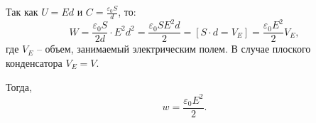     Так как \( U = Ed\) и \( C = \frac{\varepsilon_0 S}{d} \), то:
    \[
        W = \frac{\varepsilon_0 S}{2d} \cdot E^2 d^2 =
        \frac{\varepsilon_0 S E^2 d}{2} = [ S \cdot d = V_E ] =
        \frac{\varepsilon_0 E^2}{2} V_E,
    \]
    где \( V_E \) -- объем, занимаемый электрическим полем. В случае плоского 
    конденсатора \( V_E = V \).

    Тогда,
    \[
        w = \frac{\varepsilon_0 E^2}{2}.
    \]
